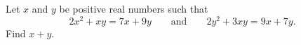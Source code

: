 Let $x$ and $y$ be positive real numbers such that
\[2x^2+xy=7x+9y\qquad\text{and}\qquad2y^2+3xy=9x+7y.\]
Find $x+y$.
